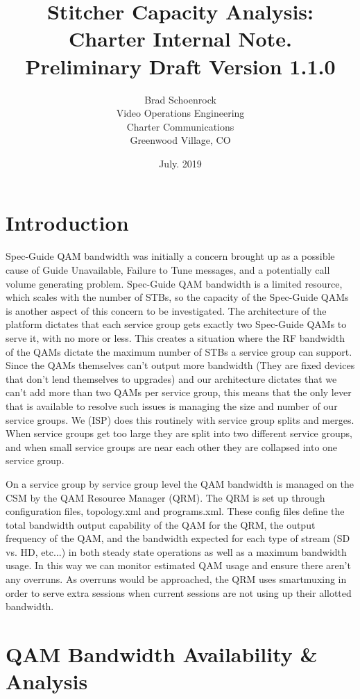 \documentclass{article}
\author{Brad Schoenrock\\Video Operations Engineering\\Charter Communications\\Greenwood Village, CO}
\title{Stitcher Capacity Analysis:\\Charter Internal Note.\\Preliminary Draft Version 1.1.0}
\date{July. 2019}
\begin{document}
\maketitle
\newpage

\tableofcontents
\newpage

\section{Introduction}
\label{SECTION-Introduction}

Spec-Guide QAM bandwidth was initially a concern brought up as a possible cause of Guide Unavailable, Failure to Tune messages, and a potentially call volume generating problem. Spec-Guide QAM bandwidth is a limited resource, which scales with the number of STBs, so the capacity of the Spec-Guide QAMs is another aspect of this concern to be investigated. The architecture of the platform dictates that each service group gets exactly two Spec-Guide QAMs to serve it, with no more or less. This creates a situation where the RF bandwidth of the QAMs dictate the maximum number of STBs a service group can support. Since the QAMs themselves can't output more bandwidth (They are fixed devices that don't lend themselves to upgrades) and our architecture dictates that we can't add more than two QAMs per service group, this means that the only lever that is available to resolve such issues is managing the size and number of our service groups. We (ISP) does this routinely with service group splits and merges. When service groups get too large they are split into two different service groups, and when small service groups are near each other they are collapsed into one service group. 

On a service group by service group level the QAM bandwidth is managed on the CSM by the QAM Resource Manager (QRM). The QRM is set up through configuration files, topology.xml and programs.xml. These config files define the total bandwidth output capability of the QAM for the QRM, the output frequency of the QAM, and the bandwidth expected for each type of stream (SD vs. HD, etc...) in both steady state operations as well as a maximum bandwidth usage. In this way we can monitor estimated QAM usage and ensure there aren't any overruns. As overruns would be approached, the QRM uses smartmuxing in order to serve extra sessions when current sessions are not using up their allotted bandwidth. 



\section{QAM Bandwidth Availability \& Analysis}
\label{SECTION-QAMCapacity}
\end{document}
